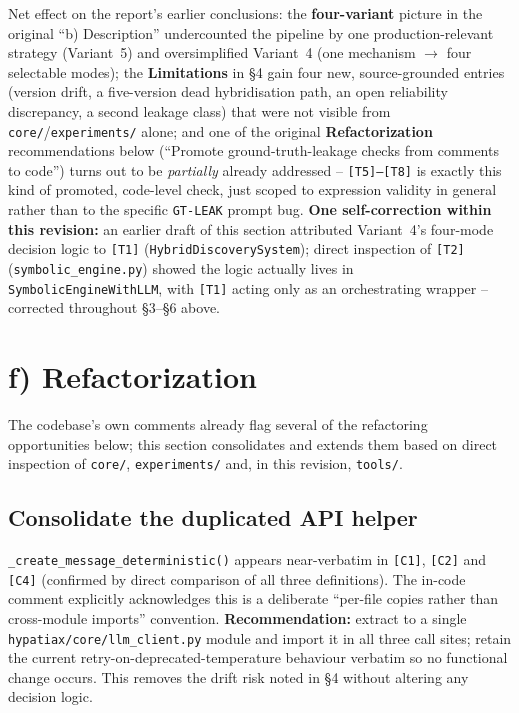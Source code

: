 \documentclass[11pt,a4paper]{article}
\newcommand{\code}[1]{\texttt{\small #1}}
\begin{document}
\noindent Net effect on the report's earlier conclusions: the
\textbf{four-variant} picture in the original ``b) Description'' undercounted
the pipeline by one production-relevant strategy (Variant~5) and
oversimplified Variant~4 (one mechanism $\to$ four selectable modes); the
\textbf{Limitations} in \S4 gain four new, source-grounded entries (version
drift, a five-version dead hybridisation path, an open reliability
discrepancy, a second leakage class) that were not visible from
\code{core/}/\code{experiments/} alone; and one of the original
\textbf{Refactorization} recommendations below (``Promote
ground-truth-leakage checks from comments to code'') turns out to be
\emph{partially} already addressed -- \code{[T5]--[T8]} is exactly this
kind of promoted, code-level check, just scoped to expression validity in
general rather than to the specific \code{GT-LEAK} prompt bug. \textbf{One
self-correction within this revision:} an earlier draft of this section
attributed Variant~4's four-mode decision logic to \code{[T1]}
(\code{HybridDiscoverySystem}); direct inspection of \code{[T2]}
(\code{symbolic\_engine.py}) showed the logic actually lives in
\code{SymbolicEngineWithLLM}, with \code{[T1]} acting only as an
orchestrating wrapper -- corrected throughout \S3--\S6 above.

\section{f) Refactorization}

The codebase's own comments already flag several of the refactoring
opportunities below; this section consolidates and extends them based on
direct inspection of \code{core/}, \code{experiments/} and, in this
revision, \code{tools/}.

\subsection{Consolidate the duplicated API helper}
\code{\_create\_message\_deterministic()} appears near-verbatim in
\code{[C1]}, \code{[C2]} and \code{[C4]} (confirmed by direct comparison of
all three definitions). The in-code comment explicitly acknowledges this is
a deliberate ``per-file copies rather than cross-module imports''
convention. \textbf{Recommendation:} extract to a single
\code{hypatiax/core/llm\_client.py} module and import it in all three
call sites; retain the current retry-on-deprecated-temperature behaviour
verbatim so no functional change occurs. This removes the drift risk noted
in \S4 without altering any decision logic.
\end{document}

